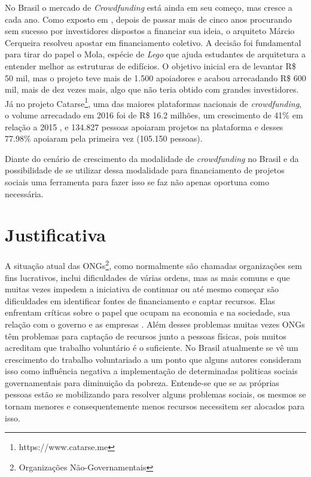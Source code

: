 No Brasil o mercado de \emph{Crowdfunding} está ainda em seu começo, mas cresce a cada ano. Como exposto em \cite{globo-financiamento}, depois de passar mais de cinco anos procurando sem sucesso por investidores dispostos a financiar sua ideia, o arquiteto Márcio Cerqueira resolveu apostar em financiamento coletivo. A decisão foi fundamental para tirar do papel o Mola, espécie de \emph{Lego} que ajuda estudantes de arquitetura a entender melhor as estruturas de edifícios. O objetivo inicial era de levantar R\$ 50 mil, mas o projeto teve mais de 1.500 apoiadores e acabou arrecadando R\$ 600 mil, mais de dez vezes mais, algo que não teria obtido com grandes investidores. Já no projeto Catarse\footnote{https://www.catarse.me}, uma das maiores plataformas nacionais de \emph{crowdfunding}, o volume arrecadado em 2016 foi de R\$ 16.2 milhões, um crescimento de 41\% em relação a 2015 \cite{catarse-retrospectiva2016}, e 134.827 pessoas apoiaram projetos na plataforma e desses 77.98\% apoiaram pela primeira vez (105.150 pessoas).

Diante do cenário de crescimento da modalidade de \emph{crowdfunding} no Brasil e da possibilidade de se utilizar dessa modalidade para financiamento de projetos sociais uma ferramenta para fazer isso se faz não apenas oportuna como necessária.



\section{Justificativa}
A situação atual das ONGs\footnote{Organizações Não-Governamentais}, como normalmente são chamadas organizações sem fins lucrativos, inclui dificuldades de várias ordens, mas as mais comuns e que muitas vezes impedem a iniciativa de continuar ou até mesmo começar são dificuldades em identificar fontes de financiamento e captar recursos. Elas enfrentam críticas sobre o papel que ocupam na economia e na sociedade, sua relação com o governo e as empresas \cite{GOUVEIA2007}. Além desses problemas muitas vezes ONGs têm problemas para captação de recursos junto a pessoas físicas, pois muitos acreditam que trabalho voluntário é o suficiente. No Brasil atualmente se vê um crescimento do trabalho voluntariado a um ponto que alguns autores \cite{fagundes2012repercussoes} consideram isso como influência negativa a implementação de determinadas politicas sociais governamentais para diminuição da pobreza. Entende-se que se as próprias pessoas estão se mobilizando para resolver alguns problemas sociais, os mesmos se tornam menores e consequentemente menos recursos necessitem ser alocados para isso.

